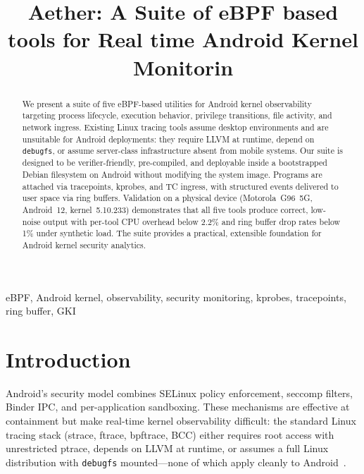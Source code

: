 \documentclass[conference]{IEEEtran}
\begin{document}
\title{Aether: A Suite of eBPF based tools for Real time Android Kernel Monitorin}

\author{
  \and
}

\maketitle

\begin{abstract}
We present a suite of five eBPF-based utilities for Android kernel observability targeting process lifecycle, execution behavior, privilege transitions, file activity, and network ingress. Existing Linux tracing tools assume desktop environments and are unsuitable for Android deployments: they require LLVM at runtime, depend on \texttt{debugfs}, or assume server-class infrastructure absent from mobile systems. Our suite is designed to be verifier-friendly, pre-compiled, and deployable inside a bootstrapped Debian filesystem on Android without modifying the system image. Programs are attached via tracepoints, kprobes, and TC ingress, with structured events delivered to user space via ring buffers. Validation on a physical device (Motorola~G96~5G, Android~12, kernel~5.10.233) demonstrates that all five tools produce correct, low-noise output with per-tool CPU overhead below 2.2\% and ring buffer drop rates below 1\% under synthetic load. The suite provides a practical, extensible foundation for Android kernel security analytics.
\end{abstract}

\begin{IEEEkeywords}
eBPF, Android kernel, observability, security monitoring, kprobes, tracepoints, ring buffer, GKI
\end{IEEEkeywords}

\section{Introduction}
Android's security model combines SELinux policy enforcement, seccomp filters, Binder IPC, and per-application sandboxing. These mechanisms are effective at containment but make real-time kernel observability difficult: the standard Linux tracing stack (strace, ftrace, bpftrace, BCC) either requires root access with unrestricted ptrace, depends on LLVM at runtime, or assumes a full Linux distribution with \texttt{debugfs} mounted---none of which apply cleanly to Android~\cite{android_security,android_selinux}.
\end{document}
